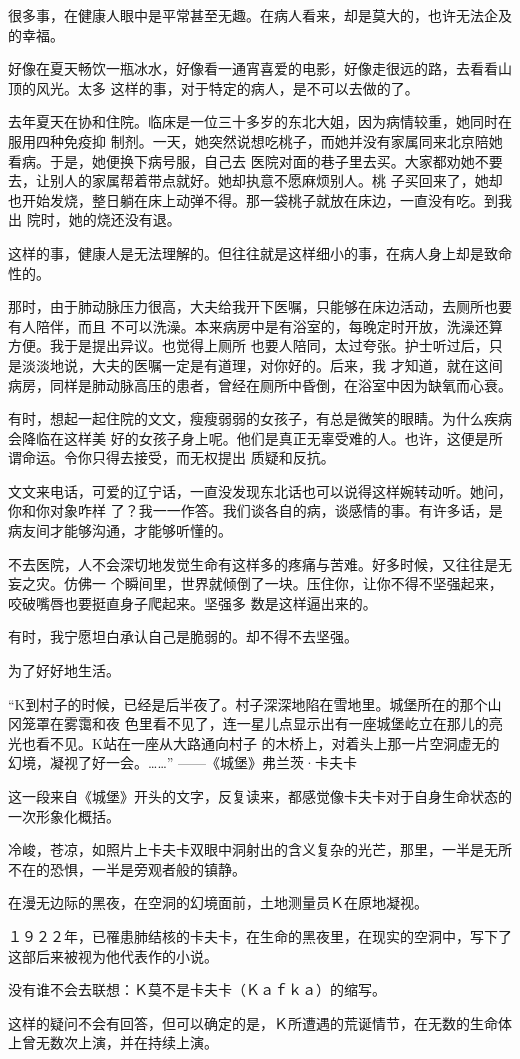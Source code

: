 \documentclass[12pt,a4paper]{article}
\begin{document}
		很多事，在健康人眼中是平常甚至无趣。在病人看来，却是莫大的，也许无法企及的幸福。

		好像在夏天畅饮一瓶冰水，好像看一通宵喜爱的电影，好像走很远的路，去看看山顶的风光。太多
	这样的事，对于特定的病人，是不可以去做的了。

		去年夏天在协和住院。临床是一位三十多岁的东北大姐，因为病情较重，她同时在服用四种免疫抑
	制剂。一天，她突然说想吃桃子，而她并没有家属同来北京陪她看病。于是，她便换下病号服，自己去
	医院对面的巷子里去买。大家都劝她不要去，让别人的家属帮着带点就好。她却执意不愿麻烦别人。桃
	子买回来了，她却也开始发烧，整日躺在床上动弹不得。那一袋桃子就放在床边，一直没有吃。到我出
	院时，她的烧还没有退。

		这样的事，健康人是无法理解的。但往往就是这样细小的事，在病人身上却是致命性的。

		那时，由于肺动脉压力很高，大夫给我开下医嘱，只能够在床边活动，去厕所也要有人陪伴，而且
	不可以洗澡。本来病房中是有浴室的，每晚定时开放，洗澡还算方便。我于是提出异议。也觉得上厕所
	也要人陪同，太过夸张。护士听过后，只是淡淡地说，大夫的医嘱一定是有道理，对你好的。后来，我
	才知道，就在这间病房，同样是肺动脉高压的患者，曾经在厕所中昏倒，在浴室中因为缺氧而心衰。

		有时，想起一起住院的文文，瘦瘦弱弱的女孩子，有总是微笑的眼睛。为什么疾病会降临在这样美
	好的女孩子身上呢。他们是真正无辜受难的人。也许，这便是所谓命运。令你只得去接受，而无权提出
	质疑和反抗。

		文文来电话，可爱的辽宁话，一直没发现东北话也可以说得这样婉转动听。她问，你和你对象咋样
	了？我一一作答。我们谈各自的病，谈感情的事。有许多话，是病友间才能够沟通，才能够听懂的。

		不去医院，人不会深切地发觉生命有这样多的疼痛与苦难。好多时候，又往往是无妄之灾。仿佛一
	个瞬间里，世界就倾倒了一块。压住你，让你不得不坚强起来，咬破嘴唇也要挺直身子爬起来。坚强多
	数是这样逼出来的。

		有时，我宁愿坦白承认自己是脆弱的。却不得不去坚强。

		为了好好地生活。

	\endwriting



		“K到村子的时候，已经是后半夜了。村子深深地陷在雪地里。城堡所在的那个山冈笼罩在雾霭和夜
	色里看不见了，连一星儿点显示出有一座城堡屹立在那儿的亮光也看不见。K站在一座从大路通向村子
	的木桥上，对着头上那一片空洞虚无的幻境，凝视了好一会。……” ——《城堡》弗兰茨·卡夫卡

		这一段来自《城堡》开头的文字，反复读来，都感觉像卡夫卡对于自身生命状态的一次形象化概括。\par
		冷峻，苍凉，如照片上卡夫卡双眼中洞射出的含义复杂的光芒，那里，一半是无所不在的恐惧，一半是旁观者般的镇静。\par
		在漫无边际的黑夜，在空洞的幻境面前，土地测量员Ｋ在原地凝视。\par
		１９２２年，已罹患肺结核的卡夫卡，在生命的黑夜里，在现实的空洞中，写下了这部后来被视为他代表作的小说。\par
		没有谁不会去联想：Ｋ莫不是卡夫卡（Ｋａｆｋａ）的缩写。\par
		这样的疑问不会有回答，但可以确定的是，Ｋ所遭遇的荒诞情节，在无数的生命体上曾无数次上演，并在持续上演。
\end{document}
